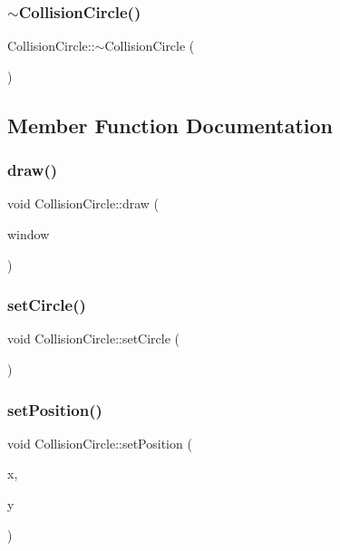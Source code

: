 \subsubsection{\texorpdfstring{$\sim$CollisionCircle()}{~CollisionCircle()}}
{\footnotesize\ttfamily Collision\+Circle\+::$\sim$\+Collision\+Circle (\begin{DoxyParamCaption}{ }\end{DoxyParamCaption})}



\subsection{Member Function Documentation}
\mbox{\label{class_collision_circle_a7f743d977b9208d0d448c284c765f729}} 
\subsubsection{\texorpdfstring{draw()}{draw()}}
{\footnotesize\ttfamily void Collision\+Circle\+::draw (\begin{DoxyParamCaption}\item[{sf\+::\+Render\+Window \&}]{window }\end{DoxyParamCaption})}

\mbox{\label{class_collision_circle_aa6d2172fb25f3026bc1723790d6fc936}} 
\subsubsection{\texorpdfstring{setCircle()}{setCircle()}}
{\footnotesize\ttfamily void Collision\+Circle\+::set\+Circle (\begin{DoxyParamCaption}{ }\end{DoxyParamCaption})}

\mbox{\label{class_collision_circle_a2ea64c14b34de9adde37518dbec4fa55}} 
\subsubsection{\texorpdfstring{setPosition()}{setPosition()}\hspace{0.1cm}{\footnotesize\ttfamily [1/2]}}
{\footnotesize\ttfamily void Collision\+Circle\+::set\+Position (\begin{DoxyParamCaption}\item[{float}]{x,  }\item[{float}]{y }\end{DoxyParamCaption})}

